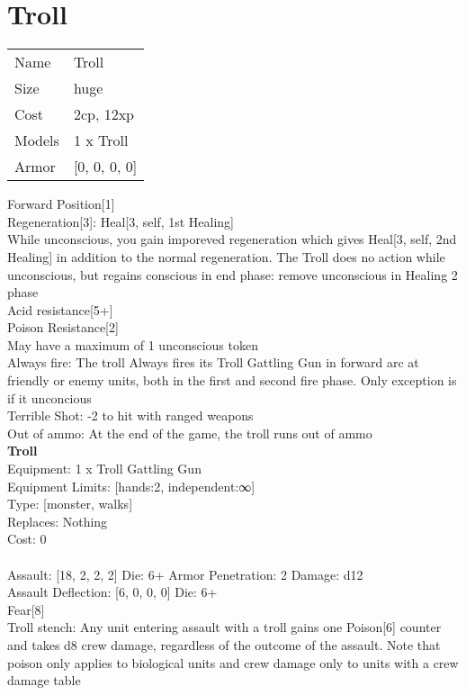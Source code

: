 \pagebreak

\section{ Troll }

\begin{tabular}{ll}
  Name & Troll \\
  Size & huge\\
  Cost & 2cp, 12xp\\
  Models & 1 x Troll\\
  Armor & [0, 0, 0, 0]\\
\end{tabular}

\noindent Forward Position[1]\\ 
Regeneration[3]: Heal[3, self, 1st Healing]\\ 
While unconscious, you gain imporeved regeneration which gives Heal[3, self, 2nd Healing] in addition to the normal regeneration. The Troll does no action while unconscious, but regains conscious in end phase: remove unconscious in Healing 2 phase\\ 
Acid resistance[5+]\\ 
Poison Resistance[2]\\ 
May have a maximum of 1 unconscious token\\ 
Always fire: The troll Always fires its Troll Gattling Gun in forward arc at friendly or enemy units, both in the first and second fire phase. Only exception is if it unconcious\\ 
Terrible Shot: -2 to hit with ranged weapons\\ 
Out of ammo: At the end of the game, the troll runs out of ammo\\ 


{\bf Troll } \\
Equipment: 1 x Troll Gattling Gun \\
Equipment Limits: [hands:2, independent:∞] \\
Type: [monster, walks] \\
Replaces: Nothing \\
Cost: 0\\
\ \\
Assault: [18, 2, 2, 2] Die: 6+ Armor Penetration: 2 Damage: d12 \\
Assault Deflection: [6, 0, 0, 0] Die: 6+\\
\indent Fear[8]\\ 
Troll stench: Any unit entering assault with a troll gains one Poison[6] counter and takes d8 crew damage, regardless of the outcome of the assault. Note that poison only applies to biological units and crew damage only to units with a crew damage table\\ 
 
